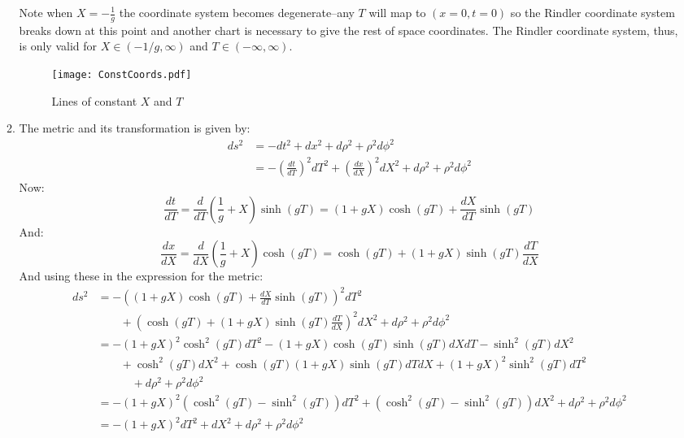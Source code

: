 \documentclass[12pt,a4]{article}
\begin{document}
\begin{enumerate}
\begin{enumerate}
        Note when $X = -\frac{1}{g}$ the coordinate system becomes degenerate--any $T$ will map to $(x = 0, t = 0)$ so the Rindler coordinate system breaks down at this point and another chart is necessary to give the rest of space coordinates.
        The Rindler coordinate system, thus, is only valid for $X \in (-1/g, \infty)$ and $T \in (-\infty, \infty)$.
        \begin{figure}[H]
          \centering
          \texttt{[image: ConstCoords.pdf]}
          \caption{Lines of constant $X$ and $T$}
          \label{fig:constCoords}
        \end{figure}
      \item 
        The metric and its transformation is given by:
        \begin{align*}
          ds^2 &= -dt^2 + dx^2 + d\rho^2 + \rho^2d\phi^2\\
               &= -\left(\frac{dt}{dT}\right)^2dT^2 + \left(\frac{dx}{dX}\right)^2 dX^2 + d\rho^2 + \rho^2d\phi^2
        \end{align*}
        Now:
        \begin{equation*}
          \frac{d t}{dT} = \frac{d}{dT} \left(\frac{1}{g} + X\right) \sinh(gT) = \left(1 + gX\right) \cosh(gT) + \frac{d X}{dT} \sinh(gT)
        \end{equation*}
        And:
        \begin{equation*}
          \frac{d x}{dX} = \frac{d}{dX} \left(\frac{1}{g} + X\right) \cosh(gT) =  \cosh(gT) + \left(1 + gX\right) \sinh(gT) \frac{dT}{dX}
        \end{equation*}
        And using these in the expression for the metric:
        \begin{align*}
          ds^2  &= -\left(\left(1 + gX\right) \cosh(gT) + \frac{d X}{dT} \sinh(gT)\right)^2dT^2\\
                &\qquad + \left(\cosh(gT) + \left(1 + gX\right) \sinh(gT) \frac{dT}{dX}\right)^2 dX^2 + d\rho^2 + \rho^2d\phi^2\\
                &= -\left(1 + gX\right)^2 \cosh^2(gT)dT^2 - \left(1 + gX\right) \cosh(gT) \sinh(gT)dXdT - \sinh^2(gT) dX^2\\
                &\qquad + \cosh^2(gT)dX^2 + \cosh(gT)\left(1 + gX\right) \sinh(gT) dT dX + \left(1 + gX\right)^2 \sinh^2(gT) dT^2\\
                &\qquad \quad + d\rho^2 + \rho^2d\phi^2\\
                &= -\left(1 + gX\right)^2 (\cosh^2(gT) - \sinh^2(gT))dT^2  + (\cosh^2(gT) - \sinh^2(gT)) dX^2 + d\rho^2 + \rho^2d\phi^2\\
                &= -\left(1 + gX\right)^2 dT^2  +  dX^2 + d\rho^2 + \rho^2d\phi^2
        \end{align*}
    \end{enumerate}


\end{enumerate}
\end{document}
